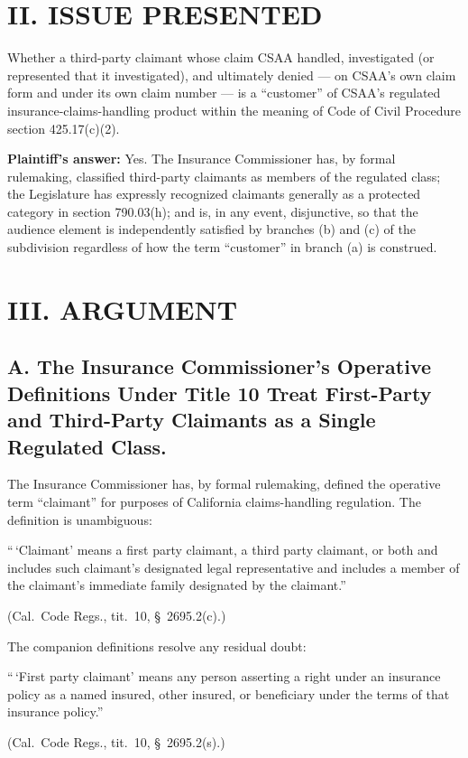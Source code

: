 \section*{II. ISSUE PRESENTED}

Whether a third-party claimant whose claim CSAA handled, investigated (or represented that it investigated), and ultimately denied --- on CSAA's own claim form and under its own claim number --- is a ``customer'' of CSAA's regulated insurance-claims-handling product within the meaning of Code of Civil Procedure section 425.17(c)(2).

\textbf{Plaintiff's answer:} Yes. The Insurance Commissioner has, by formal rulemaking, classified third-party claimants as members of the regulated class; the Legislature has expressly recognized claimants generally as a protected category in section 790.03(h); and  is, in any event, disjunctive, so that the audience element is independently satisfied by branches (b) and (c) of the subdivision regardless of how the term ``customer'' in branch (a) is construed.

\section*{III. ARGUMENT}

\subsection*{A. The Insurance Commissioner's Operative Definitions Under Title 10 Treat First-Party and Third-Party Claimants as a Single Regulated Class.}

The Insurance Commissioner has, by formal rulemaking, defined the operative term ``claimant'' for purposes of California claims-handling regulation. The definition is unambiguous:

\begin{quoting}
``\,`Claimant' means a first party claimant, a third party claimant, or both and includes such claimant's designated legal representative and includes a member of the claimant's immediate family designated by the claimant.''
\end{quoting}
\begin{flushright}
\small (Cal.\ Code Regs., tit.\ 10, \S~2695.2(c).)
\end{flushright}

\noindent The companion definitions resolve any residual doubt:

\begin{quoting}
``\,`First party claimant' means any person asserting a right under an insurance policy as a named insured, other insured, or beneficiary under the terms of that insurance policy.''
\end{quoting}
\begin{flushright}
\small (Cal.\ Code Regs., tit.\ 10, \S~2695.2(s).)
\end{flushright}


